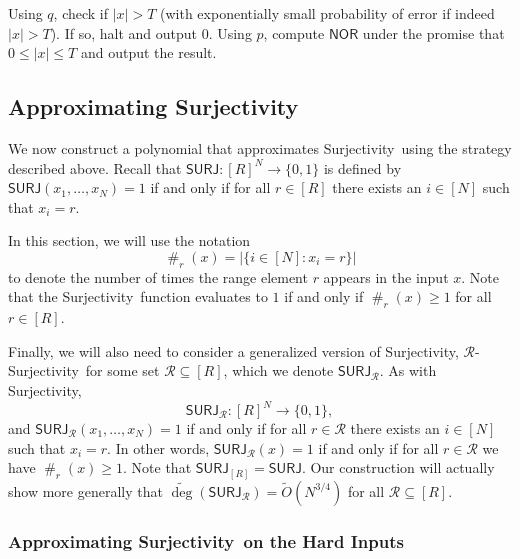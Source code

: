 \documentclass[11pt, letterpaper, fleqn]{article}
\theoremstyle{plain}
\newcommand{\SURJ}{\mathsf{ SURJ}}
\newcommand{\Surjectivity}{Surjectivity}
\newcommand{\NOR}{\mathsf{ NOR}}
\newcommand{\B}{\{0,1\}}
\newcommand{\tO}{\tilde{O}}
\newcommand{\Rcal}{\mathcal{R}}
\newcommand{\adeg}{\widetilde{\operatorname{deg}}}
\newcommand{\fr}{\operatorname{\#}}
\begin{document}
\begin{algorithm}
\caption{An informal description of the polynomial approximation for $\NOR$}\label{alg:NOR}
\begin{algorithmic}[1]
\vspace{0.25em}
\State Using $q$, check if $|x|>T$ (with exponentially small probability of error if indeed $|x| > T$). If so, halt and output 0. 
\State Using $p$, compute $\NOR$ under the promise that $0\leq |x| \leq T$ and output the result.
\end{algorithmic}
\end{algorithm}



\subsection{Approximating \Surjectivity}
\label{s:formal}
We now construct a polynomial that approximates \Surjectivity\ using the strategy described above. Recall that $\SURJ : [R]^N \to \B$ is defined by $\SURJ(x_1, \dots, x_N) = 1$ if and only if for all $r \in [R]$ there exists an $i \in [N]$ such that $x_i = r$.

In this section, we will use the notation
\begin{equation}
    \fr_r(x) = |\{i \in [N]: x_i=r\}|
\end{equation} 
to denote the number of times the range element $r$ appears in the input $x$. Note that the \Surjectivity\ function evaluates to $1$ if and only if $\fr_r(x)\geq 1$ for all $r\in[R]$.

Finally, we will also need to consider a generalized version of \Surjectivity, $\Rcal$-\Surjectivity\ for some set $\Rcal \subseteq [R]$, which we denote $\SURJ_{\Rcal}$. 
As with \Surjectivity, 
\begin{equation}
    \SURJ_{\Rcal}:[R]^N \to \B,
\end{equation}
and $\SURJ_{\Rcal}(x_1, \ldots, x_N) = 1$ if and only if for all $r \in \Rcal$ there exists an $i\in [N]$ such that $x_i = r$. 
In other words, $\SURJ_\Rcal(x)=1$ if and only if for all $r\in\Rcal$ we have $\fr_r(x)\geq 1$.
Note that $\SURJ_{[R]} = \SURJ$. 
Our construction will actually show more generally that $\adeg(\SURJ_{\Rcal}) = \tO(N^{3/4})$ for all $\Rcal \subseteq [R]$.


\subsubsection{Approximating \Surjectivity\ on the Hard Inputs} \label{sec:surj-hard-inputs}
\end{document}
